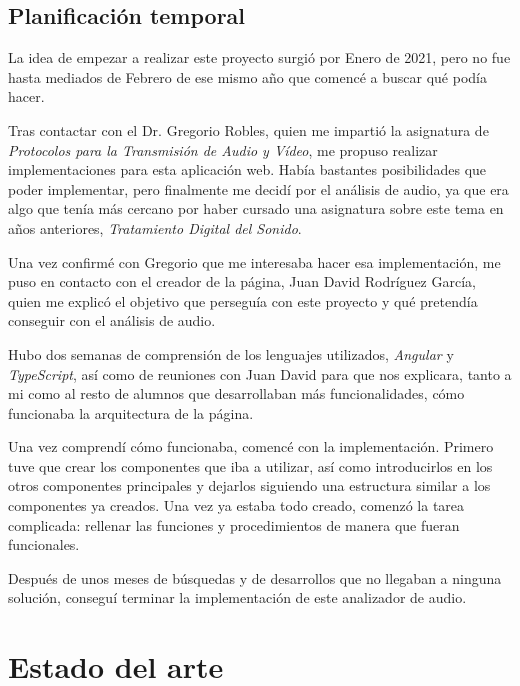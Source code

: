 \documentclass[a4paper, 12pt]{book}
\begin{document}
\section{Planificación temporal}
\label{sec:planificacion-temporal}

La idea de empezar a realizar este proyecto surgió por Enero de 2021, pero no fue hasta mediados de Febrero de ese mismo año que comencé a buscar qué podía hacer.

Tras contactar con el Dr. Gregorio Robles, quien me impartió la asignatura de \textit{Protocolos para la Transmisión de Audio y Vídeo}, me propuso realizar implementaciones para esta aplicación web. Había bastantes posibilidades que poder implementar, pero finalmente me decidí por el análisis de audio, ya que era algo que tenía más cercano por haber cursado una asignatura sobre este tema en años anteriores, \textit{Tratamiento Digital del Sonido}.

Una vez confirmé con Gregorio que me interesaba hacer esa implementación, me puso en contacto con el creador de la página, Juan David Rodríguez García, quien me explicó el objetivo que perseguía con este proyecto y qué pretendía conseguir con el análisis de audio.

Hubo dos semanas de comprensión de los lenguajes utilizados, \textit{Angular} y \textit{TypeScript}, así como de reuniones con Juan David para que nos explicara, tanto a mi como al resto de alumnos que desarrollaban más funcionalidades, cómo funcionaba la arquitectura de la página.

Una vez comprendí cómo funcionaba, comencé con la implementación. Primero tuve que crear los componentes que iba a utilizar, así como introducirlos en los otros componentes principales y dejarlos siguiendo una estructura similar a los componentes ya creados. Una vez ya estaba todo creado, comenzó la tarea complicada: rellenar las funciones y procedimientos de manera que fueran funcionales.

Después de unos meses de búsquedas y de desarrollos que no llegaban a ninguna solución, conseguí terminar la implementación de este analizador de audio.



\cleardoublepage
\chapter{Estado del arte}
\label{chap:estado}
\end{document}
